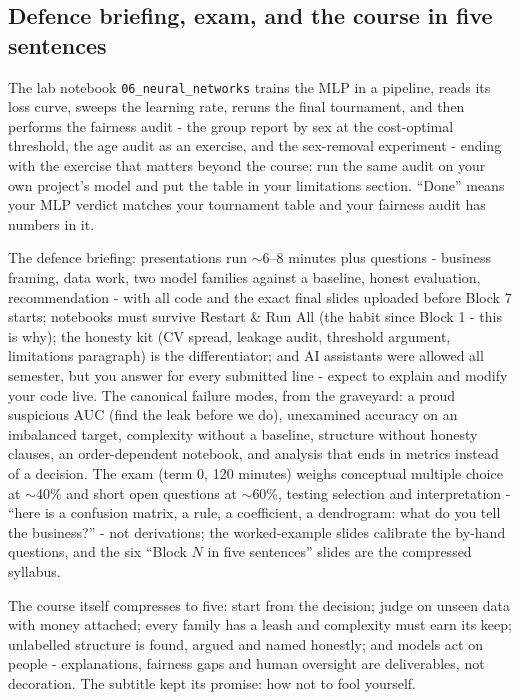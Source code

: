 \documentclass[11pt,a4paper]{article}
\begin{document}
\subsection{Defence briefing, exam, and the course in five sentences}
The lab notebook \texttt{06\_neural\_networks} trains the MLP in a
pipeline, reads its loss curve, sweeps the learning rate, reruns the
final tournament, and then performs the fairness audit - the group
report by sex at the cost-optimal threshold, the age audit as an
exercise, and the sex-removal experiment - ending with the exercise that
matters beyond the course: run the same audit on your own project's
model and put the table in your limitations section. ``Done'' means your
MLP verdict matches your tournament table and your fairness audit has
numbers in it.

The defence briefing: presentations run $\sim$6--8 minutes plus
questions - business framing, data work, two model families against a
baseline, honest evaluation, recommendation - with all code and the
exact final slides uploaded before Block 7 starts; notebooks must
survive Restart \& Run All (the habit since Block 1 - this is why); the
honesty kit (CV spread, leakage audit, threshold argument, limitations
paragraph) is the differentiator; and AI assistants were allowed all
semester, but you answer for every submitted line - expect to explain
and modify your code live. The canonical failure modes, from the
graveyard: a proud suspicious AUC (find the leak before we do),
unexamined accuracy on an imbalanced target, complexity without a
baseline, structure without honesty clauses, an order-dependent
notebook, and analysis that ends in metrics instead of a decision. The
exam (term 0, 120 minutes) weighs conceptual multiple choice at
$\sim$40\% and short open questions at $\sim$60\%, testing selection and
interpretation - ``here is a confusion matrix, a rule, a coefficient, a
dendrogram: what do you tell the business?'' - not derivations; the
worked-example slides calibrate the by-hand questions, and the six
``Block $N$ in five sentences'' slides are the compressed syllabus.

The course itself compresses to five: start from the decision; judge on
unseen data with money attached; every family has a leash and complexity
must earn its keep; unlabelled structure is found, argued and named
honestly; and models act on people - explanations, fairness gaps and
human oversight are deliverables, not decoration. The subtitle kept its
promise: how not to fool yourself.
\end{document}
